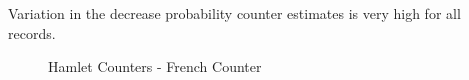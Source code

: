 \documentclass[longpaper, english, final, times]{revdetua}
\begin{document}
			Variation in the decrease probability counter estimates is very high for all records.

			\begin{figure}[!h]
				\caption{Hamlet Counters - French Counter}
				\begin{center}
				\end{center}
				\label{fig:hamletFrenchCounter}
			\end{figure}
	
\end{document}
